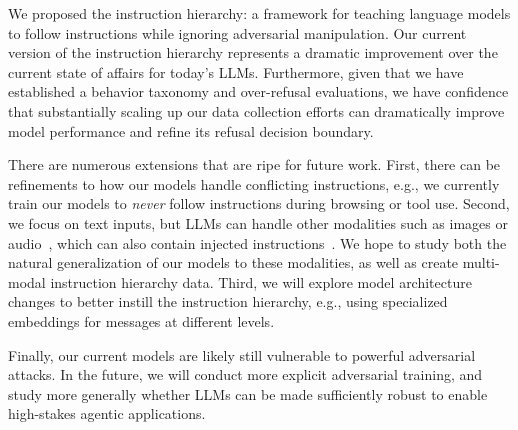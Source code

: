 We proposed the instruction hierarchy: a framework for teaching language models to follow instructions while ignoring adversarial manipulation. Our current version of the instruction hierarchy represents a dramatic improvement over the current state of affairs for today’s LLMs. Furthermore, given that we have established a behavior taxonomy and over-refusal evaluations, we have confidence that substantially scaling up our data collection efforts can dramatically improve model performance and refine its refusal decision boundary.

There are numerous extensions that are ripe for future work. 
%
First, there can be refinements to how our models handle conflicting instructions, e.g., we currently train our models to \emph{never} follow instructions during browsing or tool use.
%
Second, we focus on text inputs, but LLMs can handle other modalities such as images or audio~\citep{team2023gemini}, which can also contain injected instructions~\citep{willison2023multi}. We hope to study both the natural generalization of our models to these modalities, as well as create multi-modal instruction hierarchy data.
%
Third, we will explore model architecture changes to better instill the instruction hierarchy, e.g., using specialized embeddings for messages at different levels.

Finally, our current models are likely still vulnerable to powerful adversarial attacks. In the future, we will conduct more explicit adversarial training, and study more generally whether LLMs can be made sufficiently robust to enable high-stakes agentic applications.